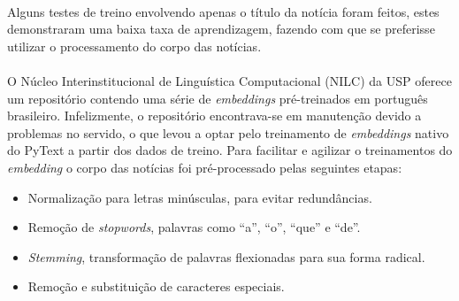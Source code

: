 \documentclass[grad,numbers]{coppe}
\begin{document}
  			\paragraph{}Alguns testes de treino envolvendo apenas o título da notícia foram feitos, estes demonstraram uma baixa taxa de aprendizagem, fazendo com que se preferisse utilizar o processamento do corpo das notícias.
  			\paragraph{}O Núcleo Interinstitucional de Linguística Computacional (NILC) da USP oferece um repositório\cite{nilc-repo} contendo uma série de \textit{embeddings} pré-treinados em português brasileiro. Infelizmente, o repositório encontrava-se em manutenção devido a problemas no servido, o que levou a optar pelo treinamento de \textit{embeddings} nativo do PyText a partir dos dados de treino. Para facilitar e agilizar o treinamentos do \textit{embedding} o corpo das notícias foi pré-processado pelas seguintes etapas:
  			\begin{itemize}
  				\item Normalização para letras minúsculas, para evitar redundâncias.
  				\item Remoção de \textit{stopwords}, palavras como ``a'', ``o'', ``que'' e ``de''.
  				\item \textit{Stemming}, transformação de palavras flexionadas para sua forma radical.
  				\item Remoção e substituição de caracteres especiais.
  			\end{itemize}
\end{document}
